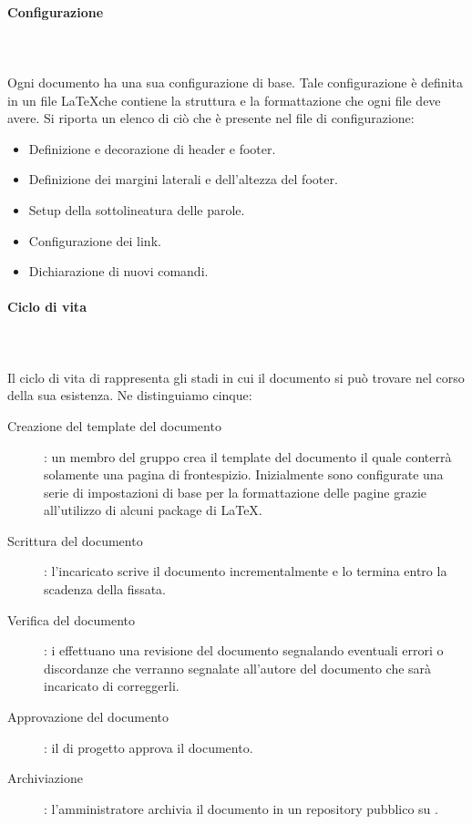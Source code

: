 \documentclass[../norme-di-progetto.tex]{subfiles}
\begin{document}
\paragraph{Configurazione} \mbox{}\\
\label{par:configurazione}
\\Ogni documento ha una sua configurazione di base. Tale configurazione è definita in un file \LaTeX  che contiene la struttura e la formattazione che ogni file deve avere. Si riporta un elenco di ciò che è presente nel file di configurazione:

\begin{itemize}
  \item Definizione e decorazione di header e footer.
  \item Definizione dei margini laterali e dell'altezza del footer.
  \item Setup della sottolineatura delle parole.
  \item Configurazione dei link.
  \item Dichiarazione di nuovi comandi.
\end{itemize}

\paragraph{Ciclo di vita}\mbox{}\\
\label{par:ciclo di vita}
\\Il ciclo di vita di rappresenta gli stadi in cui il documento si può trovare nel corso della sua esistenza. Ne distinguiamo cinque:
\begin{description}
  \item [Creazione del template del documento]: un membro del gruppo crea il template del documento il quale conterrà solamente una pagina di frontespizio. Inizialmente sono configurate una serie di impostazioni di base per la formattazione delle pagine grazie all'utilizzo di alcuni package di \LaTeX.
  \item [Scrittura del documento]: l'incaricato scrive il documento incrementalmente e lo termina entro la scadenza della  fissata.
  \item [Verifica del documento]: i  effettuano una revisione del documento segnalando eventuali errori o discordanze che verranno segnalate all'autore del documento che sarà incaricato di correggerli.
  \item [Approvazione del documento]: il  di progetto approva il documento.
  \item [Archiviazione]: l'amministratore archivia il documento in un repository pubblico su .
\end{description}
\end{document}
